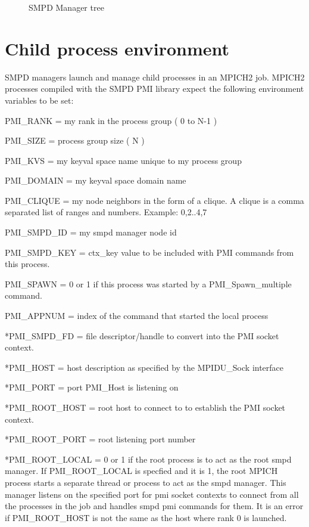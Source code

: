 \documentclass[dvipdfm,11pt]{article}
\begin{document}
\begin{figure}
\centerline{}
\caption{SMPD Manager tree}
\label{fig:tree}
\end{figure}

\section{Child process environment}
SMPD managers launch and manage child processes in an MPICH2 job.
MPICH2 processes compiled with the SMPD PMI library expect the following
environment variables to be set:

\begin{description}
\item PMI\_RANK = my rank in the process group ( 0 to N-1 )
\item PMI\_SIZE = process group size ( N )
\item PMI\_KVS = my keyval space name unique to my process group
\item PMI\_DOMAIN = my keyval space domain name
\item *PMI\_CLIQUE = my node neighbors in the form of a clique.  A clique is
a comma separated list of ranges and numbers.  Example: 0,2..4,7
\item PMI\_SMPD\_ID = my smpd manager node id
\item PMI\_SMPD\_KEY = ctx\_key value to be included with PMI commands 
from this process.
\item PMI\_SPAWN = 0 or 1 if this process was started by a 
PMI\_Spawn\_multiple command.
\item PMI\_APPNUM = index of the command that started the local process
\item **PMI\_SMPD\_FD = file descriptor/handle to convert into the PMI 
socket context.
\item **PMI\_HOST = host description as specified by the MPIDU_Sock interface
\item **PMI\_PORT = port PMI\_Host is listening on
\item **PMI\_ROOT\_HOST = root host to connect to to establish the PMI 
socket context.
\item **PMI\_ROOT\_PORT = root listening port number
\item **PMI\_ROOT\_LOCAL = 0 or 1 if the root process is to act as the root smpd manager.
If PMI\_ROOT\_LOCAL is specfied and it is 1, the root MPICH process starts a separate
thread or process to act as the smpd manager.  This manager listens on the specified port
for pmi socket contexts to connect from all the processes in the job and handles smpd pmi
commands for them.  It is an error if PMI\_ROOT\_HOST is not the same as the host where
rank 0 is launched.
\end{description}
\end{document}
